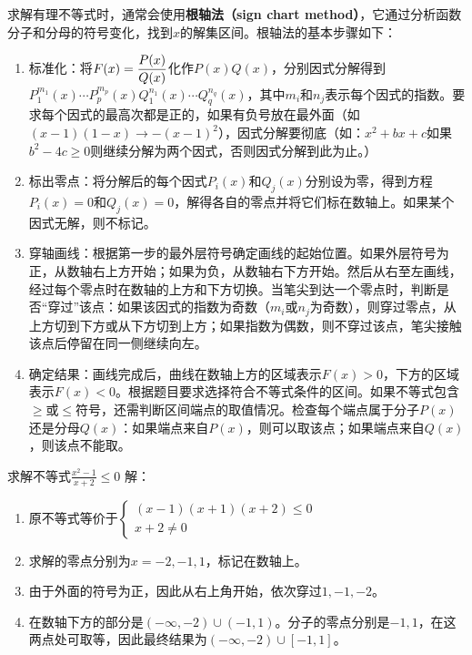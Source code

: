求解有理不等式时，通常会使用\textbf{根轴法（sign chart method）}，它通过分析函数分子和分母的符号变化，找到$x$的解集区间。根轴法的基本步骤如下：
\begin{enumerate}
\item 标准化：将$\displaystyle F(x)={P(x)\over Q(x)}$化作$P(x)Q(x)$，分别因式分解得到$P^{m_1}_1(x)\cdots P^{m_p}_p(x)Q^{n_1}_1(x)\cdots Q^{n_q}_q(x)$，其中$m_i$和$n_j$表示每个因式的指数。要求每个因式的最高次都是正的，如果有负号放在最外面（如$(x-1)(1-x)\to-(x-1)^2$），因式分解要彻底（如：$x^2+bx+c$如果$b^2-4c\geq0$则继续分解为两个因式，否则因式分解到此为止。）
\item 标出零点：将分解后的每个因式$P_i(x)$和$Q_j(x)$分别设为零，得到方程$P_i(x) = 0$和$Q_j(x) = 0$，解得各自的零点并将它们标在数轴上。如果某个因式无解，则不标记。
\item 穿轴画线：根据第一步的最外层符号确定画线的起始位置。如果外层符号为正，从数轴右上方开始；如果为负，从数轴右下方开始。然后从右至左画线，经过每个零点时在数轴的上方和下方切换。当笔尖到达一个零点时，判断是否“穿过”该点：如果该因式的指数为奇数（$m_i$或$n_j$为奇数），则穿过零点，从上方切到下方或从下方切到上方；如果指数为偶数，则不穿过该点，笔尖接触该点后停留在同一侧继续向左。
\item 确定结果：画线完成后，曲线在数轴上方的区域表示$F(x) > 0$，下方的区域表示$F(x) < 0$。根据题目要求选择符合不等式条件的区间。如果不等式包含$\geq$或$\leq$符号，还需判断区间端点的取值情况。检查每个端点属于分子$P(x)$还是分母$Q(x)$：如果端点来自$P(x)$，则可以取该点；如果端点来自$Q(x)$，则该点不能取。
\end{enumerate}
\begin{example}{求解不等式$\displaystyle \frac{x^2 - 1}{x + 2} \leq 0$}
解：
\begin{enumerate}
\item 原不等式等价于$\begin{cases}(x-1)(x+1)(x+2)\leq0 \\ x+2\neq0\end{cases}$
\item 求解的零点分别为$x=-2,-1,1$，标记在数轴上。
\item 由于外面的符号为正，因此从右上角开始，依次穿过$1,-1,-2$。
\item 在数轴下方的部分是$(-\infty,-2)\cup(-1,1)$。分子的零点分别是$-1,1$，在这两点处可取等，因此最终结果为$(-\infty,-2)\cup[-1,1]$。
\end{enumerate}
\end{example}

